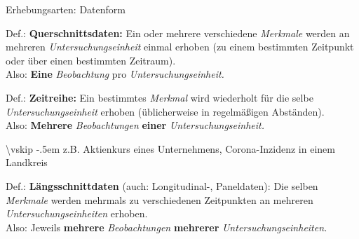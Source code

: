\documentclass[
  10pt,
  ignorenonframetext,
]{beamer}
\begin{document}
\begin{frame}{Erhebungsarten: Datenform}
\label{erhebungsarten-datenform}
\begin{block}{Def.: \textbf{Querschnittsdaten:}}
\label{def.-querschnittsdaten}
Ein oder mehrere verschiedene \emph{Merkmale} werden an mehreren
\emph{Untersuchungseinheit} einmal erhoben (zu einem bestimmten
Zeitpunkt oder über einen bestimmten Zeitraum).\\
Also: \textbf{Eine} \emph{Beobachtung} pro \emph{Untersuchungseinheit.}
\end{block}

\begin{block}{Def.: \textbf{Zeitreihe:}}
\label{def.-zeitreihe}
Ein bestimmtes \emph{Merkmal} wird wiederholt für die selbe
\emph{Untersuchungseinheit} erhoben (üblicherweise in regelmäßigen
Abständen).\\
Also: \textbf{Mehrere} \emph{Beobachtungen} \textbf{einer}
\emph{Untersuchungseinheit.}
\end{block}

\textbackslash vskip -.5em z.B. Aktienkurs eines Unternehmens,
Corona-Inzidenz in einem Landkreis

\begin{block}{Def.: \textbf{Längsschnittdaten} (auch: Longitudinal-,
Paneldaten):}
\label{def.-luxe4ngsschnittdaten-auch-longitudinal--paneldaten}
Die selben \emph{Merkmale} werden mehrmals zu verschiedenen Zeitpunkten
an mehreren \emph{Untersuchungseinheiten} erhoben.\\
Also: Jeweils \textbf{mehrere} \emph{Beobachtungen} \textbf{mehrerer}
\emph{Untersuchungseinheiten.}
\end{block}
\end{frame}
\end{document}
